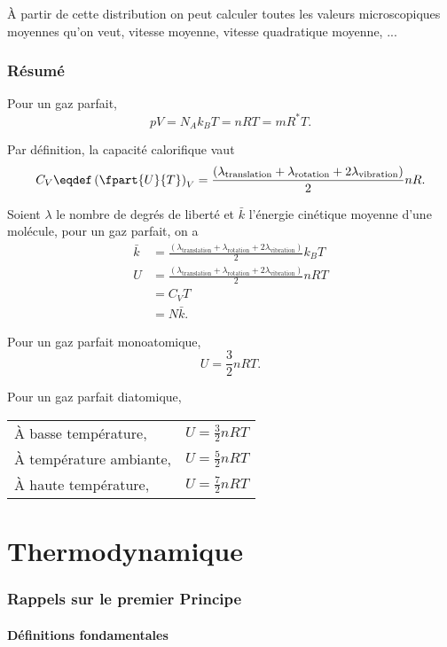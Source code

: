 À partir de cette distribution on peut calculer
toutes les valeurs microscopiques moyennes qu'on veut,
vitesse moyenne, vitesse quadratique moyenne, ...

\section{Résumé}

Pour un gaz parfait,
\[ pV = N_Ak_BT = nRT = mR^*T. \]

Par définition, la capacité calorifique vaut
\[ C_V \eqdef \left(\fpart{U}{T}\right)_V
= \frac{(\lambda_\mathrm{translation} + \lambda_\mathrm{rotation} +
2\lambda_\mathrm{vibration})}{2}nR. \]

Soient $\lambda$ le nombre de degrés de liberté
et $\bar k$ l'énergie cinétique moyenne d'une molécule,
pour un gaz parfait, on a
\begin{align*}
  \bar k & = \frac{(\lambda_\mathrm{translation} + \lambda_\mathrm{rotation} +
  2\lambda_\mathrm{vibration})}{2}k_BT\\
  U & = \frac{(\lambda_\mathrm{translation} + \lambda_\mathrm{rotation} +
  2\lambda_\mathrm{vibration})}{2}nRT\\
  & = C_V T\\
  & = N \bar k.
\end{align*}

Pour un gaz parfait monoatomique,
\[ U = \frac 32 nRT. \]

Pour un gaz parfait diatomique,
\begin{center}
  \begin{tabular}{|l|l|}
    \hline
    À basse température, &
    \( U = \frac 32 nRT \)\\
    À température ambiante, &
    \( U = \frac 52 nRT \)\\
    À haute température, &
    \( U = \frac 72 nRT \)\\
    \hline
  \end{tabular}
\end{center}

\part{Thermodynamique}
\section{Rappels sur le premier Principe}
\subsection{Définitions fondamentales}
